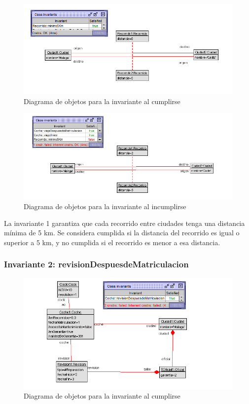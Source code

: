 \documentclass[12pt.a4paper]{article}
\begin{document}
\vspace{1.0 cm}
\begin{figure}[H]
     \includegraphics[width=1\linewidth]{Soils/1_v2.png}
     \caption{Diagrama de objetos para la invariante al cumplirse}
     \label{Diagrama del sistema de aviacion}
\end{figure}

\begin{figure}[H]
     \includegraphics[width=1\linewidth]{Soils/1.jpg}
     \caption{Diagrama de objetos para la invariante al incumplirse}
     \label{Diagrama del sistema de aviacion}
\end{figure}

La invariante 1 garantiza que cada recorrido entre ciudades tenga una distancia mínima de 5 km. Se considera cumplida si la distancia del recorrido es igual o superior a 5 km, y no cumplida si el recorrido es menor a esa distancia.

\subsubsection{Invariante 2: revisionDespuesdeMatriculacion}
\begin{figure}[H]
    \centering
     \includegraphics[width=0.75\linewidth]{Soils/2_v2.png}
     \caption{Diagrama de objetos para la invariante al cumplirse}
     \label{Diagrama del sistema de aviacion}
\end{figure}
\end{document}
